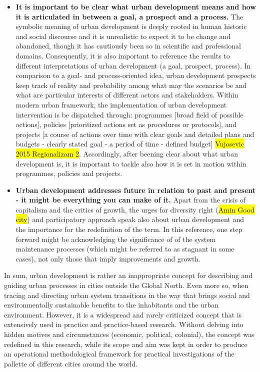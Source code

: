 \documentclass[11pt]{report}
\begin{document}
\begin{itemize}
\item \textbf{It is important to be clear what urban development means and how it is articulated in between a goal, a prospect and a process.}
The symbolic meaning of urban development is deeply rooted in human historic and social discourse and it is unrealistic to expect it to be change and abandoned, though it has cautiously been so in scientific and professional domains. 
Consequently, it is also important to reference the results to different interpretations of urban development (a goal, prospect, process).
In comparison to a goal- and process-oriented idea, urban development prospects keep track of reality and probability among what may the scenarios be and what are particular interests of different actors and stakeholders.
Within modern urban framework, the implementation of urban development intervention is be dispatched through:
programmes [broad field of possible actions],
policies [prioritized actions set as procedures or protocols],
and
projects [a course of actions over time with clear goals and detailed plans and budgets - clearly stated goal - a period of time - defined budget] \hl{Vujosevic 2015 Regionalizam 2}.
Accordingly, after beening clear about what urban development is, it is important to tackle also how it is set in motion within programmes, policies and projects.

\item \textbf{Urban development addresses future in relation to past and present - it might be everything you can make of it.}
Apart from the crisis of capitalism and the critics of growth, the
urges for diversity right (\hl{Amin Good city}) and participatory approach speak also about urban development and the importance for the redefinition of the term. 
In this reference, one step forward might be acknowledging the significance of of the system maintenance processes (which might be referred to as stagnant in some cases), not only those that imply improvements and growth.
\end{itemize}

In sum, urban development is rather an inappropriate concept for describing and guiding urban processes in cities outside the Global North.
Even more so, when tracing and directing urban system transitions in the way that brings social and environmentally sustainable benefits to the inhabitants and the urban environment.
However, it is a widespread and rarely criticized concept that is extensively used in practice and practice-based research.
Without delving into hidden motives and circumstances (economic, political, colonial), the concept was redefined in this research, while its scope and aim was kept in order to produce an operational methodological framework for practical investigations of the pallette of different cities around the world.
\end{document}
